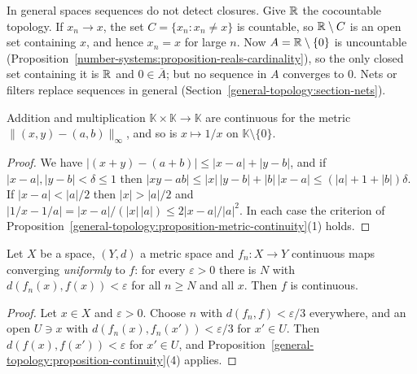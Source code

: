 \begin{counterexample}\label{general-topology:counterexample-sequences-insufficient}
In general spaces sequences do not detect closures. Give $\mathbb{R}$ the cocountable topology. If $x_n \to x$, the set $C = \{x_n : x_n \neq x\}$ is
countable, so $\mathbb{R} \setminus C$ is an open set containing $x$, and hence $x_n = x$ for large $n$. Now $A = \mathbb{R} \setminus \{0\}$ is uncountable
(Proposition~\ref{number-systems:proposition-reals-cardinality}), so the only closed set containing it is $\mathbb{R}$ and $0 \in \overline{A}$; but no
sequence in $A$ converges to $0$. Nets or filters replace sequences in general (Section~\ref{general-topology:section-nets}).
\end{counterexample}

\begin{proposition}\label{general-topology:proposition-arithmetic-continuous}
Addition and multiplication $\mathbb{K} \times \mathbb{K} \to \mathbb{K}$ are continuous for the metric $\|(x, y) - (a, b)\|_\infty$, and so is
$x \mapsto 1/x$ on $\mathbb{K} \setminus \{0\}$.
\end{proposition}

\begin{proof}
We have $|(x + y) - (a + b)| \leq |x - a| + |y - b|$, and if $|x - a|, |y - b| < \delta \leq 1$ then
$|xy - ab| \leq |x|\,|y - b| + |b|\,|x - a| \leq (|a| + 1 + |b|)\delta$. If $|x - a| < |a|/2$ then $|x| > |a|/2$ and
$|1/x - 1/a| = |x - a|/(|x|\,|a|) \leq 2|x - a|/|a|^2$. In each case the criterion of
Proposition~\ref{general-topology:proposition-metric-continuity}(1) holds.
\end{proof}

\begin{proposition}\label{general-topology:proposition-uniform-limit}
Let $X$ be a space, $(Y, d)$ a metric space and $f_n \colon X \to Y$ continuous maps converging \emph{uniformly} to $f$: for every
$\varepsilon > 0$ there is $N$ with $d(f_n(x), f(x)) < \varepsilon$ for all $n \geq N$ and all $x$. Then $f$ is continuous.
\end{proposition}

\begin{proof}
Let $x \in X$ and $\varepsilon > 0$. Choose $n$ with $d(f_n, f) < \varepsilon/3$ everywhere, and an open $U \ni x$ with
$d(f_n(x), f_n(x')) < \varepsilon/3$ for $x' \in U$. Then $d(f(x), f(x')) < \varepsilon$ for $x' \in U$, and
Proposition~\ref{general-topology:proposition-continuity}(4) applies.
\end{proof}

